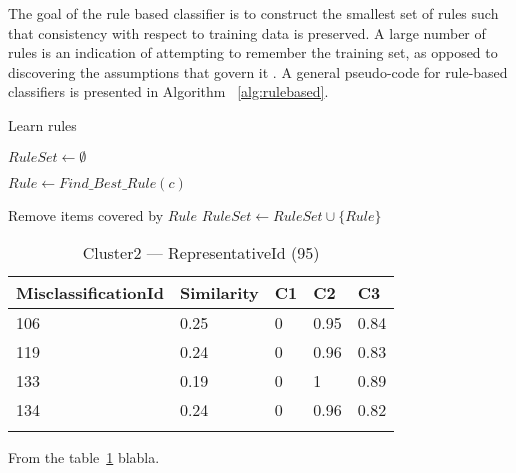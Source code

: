 The goal of the rule based classifier is to construct the smallest set of rules such that consistency with respect to training data is preserved. A large number of rules is an indication of attempting to remember the training set, as opposed to discovering the assumptions that govern it \cite{Kotsiantis07Supervised}. A general pseudo-code for rule-based classifiers is presented in Algorithm ~\ref{alg:rulebased}.

\begin{algorithm}
\caption{Learn rules}
\label{alg:rulebased}
\begin{algorithmic}[1]
\STATE $RuleSet \leftarrow \emptyset$
	\REPEAT
		\item $Rule \leftarrow Find\_Best\_Rule(c)$
		\item Remove items covered by $Rule$
	\STATE $RuleSet \leftarrow RuleSet \cup \{Rule\} $
\ENDFOR
\end{algorithmic}
\end{algorithm}

\begin{table}[h!]
\begin{tabular}{lllll}
\cline{1-5}
MisclassificationId & Similarity  & C1 & C2 & C3\\
\hline
106 & 0.25 & 0 & 0.95 & 0.84\\
119 & 0.24 & 0 & 0.96 & 0.83\\
133 & 0.19 & 0 & 1    & 0.89\\
134 & 0.24 & 0 & 0.96 & 0.82\\
\hline \\
\end{tabular}
\caption{Cluster2 --- RepresentativeId (95)}
\label{tab:cluster2id95}
\end{table}

From the table~\ref{tab:cluster2id95} blabla.


